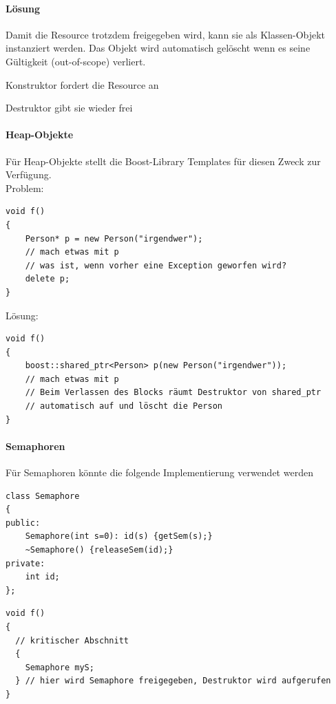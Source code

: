 \paragraph{Lösung}
Damit die Resource trotzdem freigegeben wird, kann sie als Klassen-Objekt instanziert werden. Das Objekt wird automatisch gelöscht wenn es seine Gültigkeit (out-of-scope) verliert.
\begin{compactitem}
	\item Konstruktor fordert die Resource an
	\item Destruktor gibt sie wieder frei
\end{compactitem}


\paragraph{Heap-Objekte}
Für Heap-Objekte stellt die Boost-Library Templates für diesen Zweck zur Verfügung.\\
Problem:
\begin{lstlisting}
void f()
{
	Person* p = new Person("irgendwer");
	// mach etwas mit p
	// was ist, wenn vorher eine Exception geworfen wird?
	delete p;
}
\end{lstlisting}

Lösung:
\begin{lstlisting}
void f()
{
	boost::shared_ptr<Person> p(new Person("irgendwer"));
	// mach etwas mit p
	// Beim Verlassen des Blocks räumt Destruktor von shared_ptr
	// automatisch auf und löscht die Person
}
\end{lstlisting}


\paragraph{Semaphoren} Für Semaphoren könnte die folgende Implementierung verwendet werden


\begin{lstlisting}
class Semaphore
{
public:
	Semaphore(int s=0): id(s) {getSem(s);}
	~Semaphore() {releaseSem(id);}
private:
	int id;
};
\end{lstlisting}
\begin{lstlisting}
void f()
{
  // kritischer Abschnitt
  {
    Semaphore myS;
  } // hier wird Semaphore freigegeben, Destruktor wird aufgerufen
}
\end{lstlisting}


